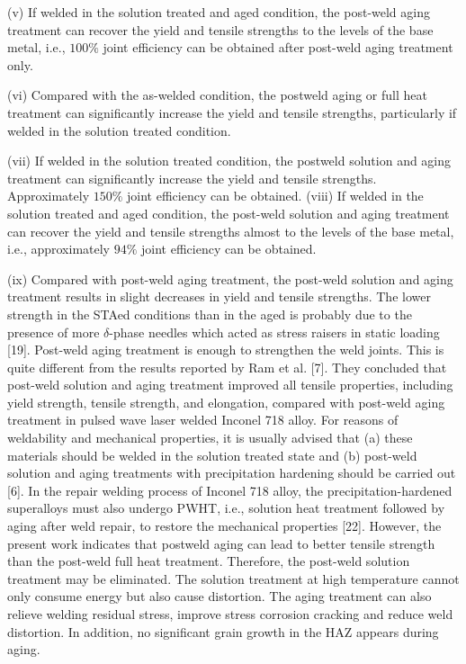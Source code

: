 \documentclass[10pt]{article}
\begin{document}
(v) If welded in the solution treated and aged condition, the post-weld aging treatment can recover the yield and tensile strengths to the levels of the base metal, i.e., $100 \%$ joint efficiency can be obtained after post-weld aging treatment only.

(vi) Compared with the as-welded condition, the postweld aging or full heat treatment can significantly increase the yield and tensile strengths, particularly if welded in the solution treated condition.

(vii) If welded in the solution treated condition, the postweld solution and aging treatment can significantly increase the yield and tensile strengths. Approximately $150 \%$ joint efficiency can be obtained. (viii) If welded in the solution treated and aged condition, the post-weld solution and aging treatment can recover the yield and tensile strengths almost to the levels of the base metal, i.e., approximately $94 \%$ joint efficiency can be obtained.

(ix) Compared with post-weld aging treatment, the post-weld solution and aging treatment results in slight decreases in yield and tensile strengths. The lower strength in the STAed conditions than in the aged is probably due to the presence of more $\delta$-phase needles which acted as stress raisers in static loading [19]. Post-weld aging treatment is enough to strengthen the weld joints. This is quite different from the results reported by Ram et al. [7]. They concluded that post-weld solution and aging treatment improved all tensile properties, including yield strength, tensile strength, and elongation, compared with post-weld aging treatment in pulsed wave laser welded Inconel 718 alloy. For reasons of weldability and mechanical properties, it is usually advised that (a) these materials should be welded in the solution treated state and (b) post-weld solution and aging treatments with precipitation hardening should be carried out [6]. In the repair welding process of Inconel 718 alloy, the precipitation-hardened superalloys must also undergo PWHT, i.e., solution heat treatment followed by aging after weld repair, to restore the mechanical properties [22]. However, the present work indicates that postweld aging can lead to better tensile strength than the post-weld full heat treatment. Therefore, the post-weld solution treatment may be eliminated. The solution treatment at high temperature cannot only consume energy but also cause distortion. The aging treatment can also relieve welding residual stress, improve stress corrosion cracking and reduce weld distortion. In addition, no significant grain growth in the HAZ appears during aging.
\end{document}
